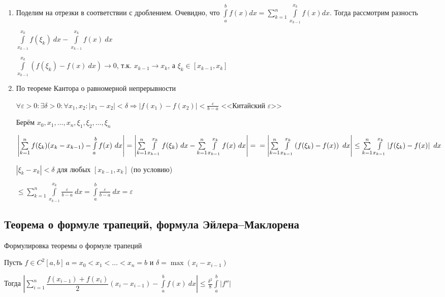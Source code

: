 \documentclass[../main.tex]{subfiles}
\begin{document}
		\begin{enumerate}
			\item Поделим на отрезки в соответствии с дроблением. Очевидно, что $\int\limits^b_a f(x) dx = \sum\limits^n_{k = 1} \int\limits^{x_k}_{x_{k - 1}} f(x) dx$. Тогда рассмотрим разность

				$\int\limits^{x_k}_{x_{k - 1}} f(\xi_k) \ dx - \int\limits^{x_k}_{x_{k - 1}} f(x) \ dx$

				$\int\limits^{x_k}_{x_{k - 1}} (f(\xi_k) - f(x) \ dx) \rightarrow 0$, т.к. $x_{k - 1} \rightarrow x_k$, а $\xi_k \in [x_{k - 1}, x_k]$

			\item По теореме Кантора о равномерной непрерывности

				$\forall \varepsilon > 0 : \exists \delta > 0 : \forall x_1, x_2 : \left| x_1 - x_2 \right| < \delta \Longrightarrow \left| f(x_1) - f(x_2) \right| < \frac{\varepsilon}{b - a}$ <<Китайский $\varepsilon$>>

				Берём $x_0, x_1, \ldots, x_n, \xi_1, \xi_2, \ldots, \xi_n$

				$\left| \sum\limits^n_{k = 1} f(\xi_k)(x_k - x_{k - 1}) - \int\limits^b_a f(x) \ dx \right| = \left| \sum\limits^n_{k = 1} \int\limits^{x_k}_{x_{k - 1}} f(\xi_k) \ dx - \sum\limits^n_{k = 1} \int\limits^{x_k}_{x_{k - 1}}f(x) \ dx \right| = \\ = \left| \sum\limits^n_{k = 1} \int\limits^{x_k}_{x_{k - 1}} \left( f(\xi_k) - f(x) \right) \ dx \right| \leq \sum\limits^n_{k = 1} \int\limits^{x_k}_{x_{k - 1}} \left| f(\xi_k) - f(x) \right| \ dx$

				$\left| \xi_k - x_k \right| < \delta$ для любых $[x_{k - 1}, x_k]$ (по условию)

				$\leq \sum\limits^n_{k = 1} \int\limits^{x_k}_{x_{k - 1}} \frac{\varepsilon}{b - a} \ dx = \int\limits^b_a \frac{\varepsilon}{b - a} \ dx = \varepsilon$

		\end{enumerate}
\newpage


\subsection{Теорема о формуле трапеций, формула Эйлера--Маклорена}
Формулировка теоремы о формуле трапеций
$$$$

			Пусть $f \in C^2[a, b] \ a = x_0 < x_1 < \ldots < x_n = b$ и $\delta = \max (x_i - x_{i - 1})$

			Тогда $\left| \sum\limits^n_{i = 1} \dfrac{f(x_{i - 1}) + f(x_i)}{2} (x_i - x_{i - 1}) - \int\limits^b_a f(x) \ dx \right| \leq \frac{\delta^2}{8} \int\limits^b_a |f''|$
\end{document}
